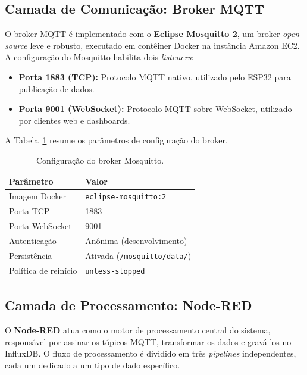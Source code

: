 \documentclass[a4paper,12pt]{article}
\begin{document}
\subsection{Camada de Comunicação: Broker MQTT}

O broker MQTT é implementado com o \textbf{Eclipse Mosquitto 2}, um broker \textit{open-source} leve e robusto, executado em contêiner Docker na instância Amazon EC2. A configuração do Mosquitto habilita dois \textit{listeners}:

\begin{itemize}[leftmargin=2cm]
    \item \textbf{Porta 1883 (TCP):} Protocolo MQTT nativo, utilizado pelo ESP32 para publicação de dados.
    \item \textbf{Porta 9001 (WebSocket):} Protocolo MQTT sobre WebSocket, utilizado por clientes web e dashboards.
\end{itemize}

A Tabela~\ref{tab:config-mosquitto} resume os parâmetros de configuração do broker.

\begin{table}[H]
\centering
\caption{Configuração do broker Mosquitto.}
\label{tab:config-mosquitto}
\begin{tabular}{ll}
\toprule
\textbf{Parâmetro} & \textbf{Valor} \\
\midrule
Imagem Docker & \texttt{eclipse-mosquitto:2} \\
Porta TCP & 1883 \\
Porta WebSocket & 9001 \\
Autenticação & Anônima (desenvolvimento) \\
Persistência & Ativada (\texttt{/mosquitto/data/}) \\
Política de reinício & \texttt{unless-stopped} \\
\bottomrule
\end{tabular}
\end{table}

\subsection{Camada de Processamento: Node-RED}

O \textbf{Node-RED} atua como o motor de processamento central do sistema, responsável por assinar os tópicos MQTT, transformar os dados e gravá-los no InfluxDB. O fluxo de processamento é dividido em três \textit{pipelines} independentes, cada um dedicado a um tipo de dado específico.
\end{document}
